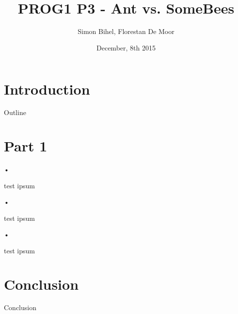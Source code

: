 \documentclass[11pt]{beamer}
\author{Simon Bihel, Florestan De Moor}
\institute{\texttt{[image: ens\_rennes]} }
\title{PROG1 P3 - Ant vs. SomeBees}
\date{December, 8th 2015}
\begin{document}
\begin{frame}
\titlepage
\end{frame}

\section*{Introduction}

\begin{frame}{Outline}
\tableofcontents
\end{frame}


\section*{Part 1}

\begin{frame}{•}
	\begin{block}{test}
	ipsum
	\end{block}
\end{frame}

\begin{frame}{•}
	\begin{exampleblock}{test}
	ipsum
	\end{exampleblock}
\end{frame}

\begin{frame}{•}
	\begin{alertblock}{test}
	ipsum
	\end{alertblock}
\end{frame}


\section*{Conclusion}

\begin{frame}{Conclusion}

\end{frame}

\begin{frame}{} %

\end{frame}
\end{document}
